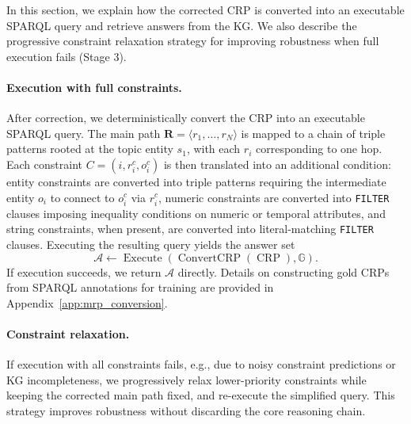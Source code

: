 \documentclass[11pt]{article}
\begin{document}
In this section, we explain how the corrected CRP is converted into an executable SPARQL query and retrieve answers from the KG. We also describe the progressive constraint relaxation strategy for improving robustness when full execution fails (Stage 3).

\paragraph{Execution with full constraints.}
After correction, we deterministically convert the CRP into an executable SPARQL query. The main path $\mathbf{R}=\langle r_1,\ldots,r_N\rangle$ is mapped to a chain of triple patterns rooted at the topic entity $s_1$, with each $r_i$ corresponding to one hop. Each constraint $C=(i,r_i^c,o_i^c)$ is then translated into an additional condition: entity constraints are converted into triple patterns requiring the intermediate entity $o_i$ to connect to $o_i^c$ via $r_i^c$, numeric constraints are converted into \texttt{FILTER} clauses imposing inequality conditions on numeric or temporal attributes, and string constraints, when present, are converted into literal-matching \texttt{FILTER} clauses. Executing the resulting query yields the answer set
\begin{equation*}
\mathcal{A} \leftarrow \operatorname{Execute}(\operatorname{ConvertCRP}(\operatorname{CRP}), \mathbb{G}).
\end{equation*}
If execution succeeds, we return $\mathcal{A}$ directly. Details on constructing gold CRPs from SPARQL annotations for training are provided in Appendix~\ref{app:mrp_conversion}.

\paragraph{Constraint relaxation.}
If execution with all constraints fails, e.g., due to noisy constraint predictions or KG incompleteness, we progressively relax lower-priority constraints while keeping the corrected main path fixed, and re-execute the simplified query. This strategy improves robustness without discarding the core reasoning chain.
\end{document}
